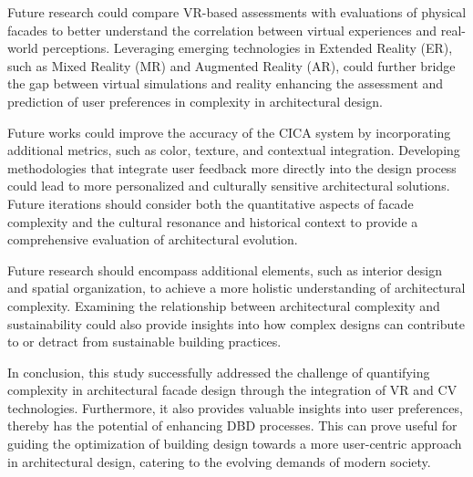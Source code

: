 Future research could compare VR-based assessments with evaluations of physical facades to better understand the correlation between virtual experiences and real-world perceptions.
Leveraging emerging technologies in Extended Reality (ER), such as Mixed Reality (MR) and Augmented Reality (AR), could further bridge the gap between virtual simulations and reality enhancing the assessment and prediction of user preferences in complexity in architectural design.

Future works could improve the accuracy of the CICA system by incorporating additional metrics, such as color, texture, and contextual integration.
Developing methodologies that integrate user feedback more directly into the design process could lead to more personalized and culturally sensitive architectural solutions.
Future iterations should consider both the quantitative aspects of facade complexity and the cultural resonance and historical context to provide a comprehensive evaluation of architectural evolution.

Future research should encompass additional elements, such as interior design and spatial organization, to achieve a more holistic understanding of architectural complexity.
Examining the relationship between architectural complexity and sustainability could also provide insights into how complex designs can contribute to or detract from sustainable building practices.

In conclusion, this study successfully addressed the challenge of quantifying complexity in architectural facade design through the integration of VR and CV technologies.
Furthermore, it also provides valuable insights into user preferences, thereby has the potential of enhancing DBD processes.
This can prove useful for guiding the optimization of building design towards a more user-centric approach in architectural design, catering to the evolving demands of modern society.